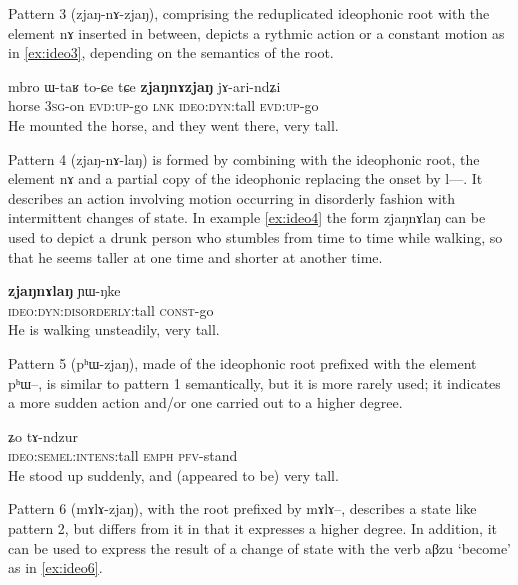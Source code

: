 \documentclass[oldfontcommands,oneside,a4paper,11pt]{article}
\newcommand{\ipa}[1]{{\phon \mbox{#1}}} %
\begin{document}
 Pattern 3 (\ipa{zjaŋ-nɤ-zjaŋ}), comprising the reduplicated ideophonic root with the element \ipa{nɤ} inserted in between, depicts a rythmic action  or a constant motion as in \ref{ex:ideo3}, depending on the semantics of the root.
 
 
 \begin{exe} 
\ex  \label{ex:ideo3}
\gll 
\ipa{mbro}  	\ipa{ɯ-taʁ}  		\ipa{to-ɕe} \ipa{tɕe}   \ipa{\textbf{zjaŋnɤzjaŋ}}  	\ipa{jɤ-ari-ndʑi}  
  \\
horse \textsc{3sg}-on  \textsc{evd:up}-go \textsc{lnk} \textsc{ideo:dyn}:tall  \textsc{evd:up}-go \\
\glt He mounted the horse, and  they went there, very tall.
 \end{exe} 
 
Pattern 4 (\ipa{zjaŋ-nɤ-laŋ}) is formed by combining with the ideophonic root, the element \ipa{nɤ} and a partial copy of the ideophonic replacing the onset by \ipa{l---}. It describes an action involving motion  occurring in disorderly fashion with intermittent changes of state. In example \ref{ex:ideo4} the form  \ipa{zjaŋnɤlaŋ} can be used to depict a drunk person who stumbles from time to time while walking, so that he seems taller at one time and shorter at another time.
 
  \begin{exe} 
\ex  \label{ex:ideo4}
\gll 
 \ipa{\textbf{zjaŋnɤlaŋ}}  	  \ipa{ɲɯ-ŋke}  \\
     \textsc{ideo:dyn:disorderly}:tall   \textsc{const}-go  \\
\glt He is  walking unsteadily, very tall. 
 \end{exe} 
 
 
 Pattern 5 (\ipa{pʰɯ-zjaŋ}), made of the ideophonic root prefixed with the element \ipa{pʰɯ--}, is similar to pattern 1 semantically, but it is more rarely used; it indicates a more sudden action and/or one carried out to a higher degree.
 
  \begin{exe} 
\ex  \label{ex:ideo5}
\gll \ipa{\textbf{pʰɯzjaŋ}} \ipa{ʑo} 	\ipa{tɤ-ndzur}  \\
\textsc{ideo:semel:intens}:tall \textsc{emph} \textsc{pfv}-stand \\
\glt He stood up suddenly, and (appeared to be) very tall.
\end{exe}

Pattern 6 (\ipa{mɤlɤ-zjaŋ}), with the root prefixed by \ipa{mɤlɤ--}, describes a state like pattern 2, but differs from it in that it expresses a higher degree. In addition, it can be used to express the result of a change of state with the verb \ipa{aβzu} `become' as in \ref{ex:ideo6}.
\end{document}
